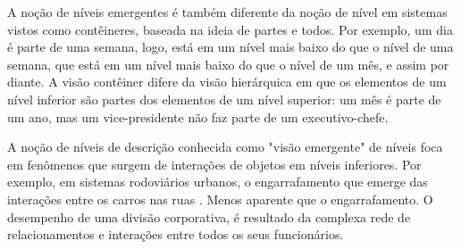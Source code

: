     \begin{figure}[h!]
        \centering
    \end{figure}
    
    A noção de níveis emergentes é também diferente da noção de nível em sistemas vistos como contêineres, baseada na ideia de partes e todos. Por exemplo, um dia é parte de uma semana, logo, está em um nível mais baixo do que o nível de uma semana, que está em um nível mais baixo do que o nível de um mês, e assim por diante. A visão contêiner difere da visão hierárquica em que os elementos de um nível inferior são partes dos elementos de um nível superior: um mês é parte de um ano, mas um vice-presidente não faz parte de um executivo-chefe. 
    
    A noção de níveis de descrição conhecida como "visão emergente" de níveis foca em fenômenos que surgem de interações de objetos em níveis inferiores. Por exemplo, em sistemas rodoviários urbanos, o engarrafamento que emerge das interações entre os carros nas ruas \cite{wilensky1999thinking}. Menos aparente que o engarrafamento. O desempenho de uma divisão corporativa, é resultado da complexa rede de relacionamentos e interações entre todos os seus funcionários. %
    
    
